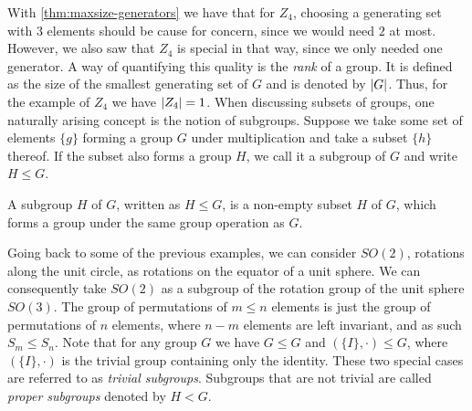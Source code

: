 %

With \cref{thm:maxsize-generators} we have that for $Z_4$, choosing a
generating set with $3$ elements should be cause for concern, since we would
need $2$ at most. However, we also saw that $Z_4$ is special in that way, since
we only needed one generator. A way of quantifying this quality is the
\emph{rank} of a group.  It is defined as the size of the smallest generating
set of $G$ and is denoted by $\abs{G}$. Thus, for the example of $Z_4$ we have
$\abs{Z_4}=1$. 
\newpage
When discussing subsets of groups, one naturally arising concept is the notion
of subgroups. Suppose we take some set of elements $\{g\}$ forming a group $G$
under multiplication and take a subset $\{h\}$ thereof. If the subset also
forms a group $H$, we call it a subgroup of $G$ and write $H \leq G$.

\begin{defn}[Subgroup]\label{defn:subgroup}
  A subgroup $H$ of $G$, written as $H \leq G$, is a non-empty subset $H$ of $G$, which forms
  a group under the same group operation as $G$. 
\end{defn}

Going back to some of the previous examples, we can consider $SO(2)$, rotations
along the unit circle, as rotations on the equator of a unit sphere. We can
consequently take $SO(2)$ as a subgroup of the rotation group of the unit
sphere $SO(3)$. The group of permutations of $m \leq n$ elements is just the
group of permutations of $n$ elements, where $n-m$ elements are left invariant,
and as such $S_m \leq S_n$. Note that for any group $G$ we have $G \leq G$ and
$(\{I\}, \cdot) \leq G$, where $\left( \{I\}, \cdot \right)$ is the trivial
group containing only the identity. These two special cases are referred to as
\emph{trivial subgroups}. Subgroups that are not trivial are called
\emph{proper subgroups} denoted by $H<G$.

